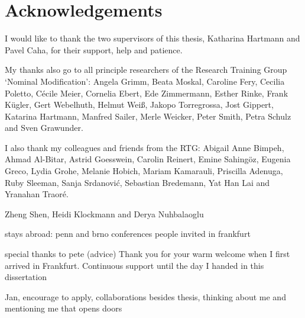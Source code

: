 
\chapter*[Acknowledgements]{Acknowledgements}

I would like to thank the two supervisors of this thesis, Katharina Hartmann and Pavel Caha, for their support, help and patience.

My thanks also go to all principle researchers of the Research Training Group `Nominal Modification':
Angela Grimm,
Beata Moskal,
Caroline Fery,
Cecilia Poletto,
Cécile Meier,
Cornelia Ebert,
Ede Zimmermann,
Esther Rinke,
Frank Kügler,
Gert Webelhuth,
Helmut Weiß,
Jakopo Torregrossa,
Jost Gippert,
Katarina Hartmann,
Manfred Sailer,
Merle Weicker,
Peter Smith,
Petra Schulz and
Sven Grawunder.

I also thank my colleagues and friends from the RTG:
Abigail Anne Bimpeh,
Ahmad Al-Bitar,
Astrid Goesswein,
Carolin Reinert,
Emine Sahingöz,
Eugenia Greco,
Lydia Grohe,
Melanie Hobich,
Mariam Kamarauli,
Priscilla Adenuga,
Ruby Sleeman,
Sanja Srdanović,
Sebastian Bredemann,
Yat Han Lai and
Yranahan Traoré.

Zheng Shen,
Heidi Klockmann and
Derya Nuhbalaoglu



stays abroad: penn and brno
conferences
people invited in frankfurt

special thanks to pete (advice)
Thank you for your warm welcome when I first arrived in Frankfurt. Continuous support until the day I handed in this dissertation

Jan, encourage to apply, collaborations besides thesis, thinking about me and mentioning me that opens doors
